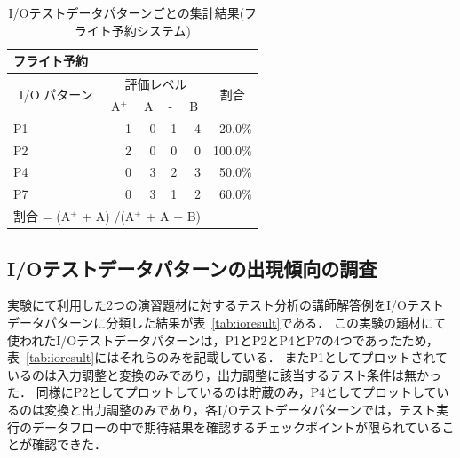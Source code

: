 \begin{table}[htbp]
  \centering
  \caption{I/Oテストデータパターンごとの集計結果(フライト予約システム)}
    \begin{tabular}{lllllr}
    フライト予約 &       &       &       &       &  \bigstrut[b]\\
    \hline
    \multicolumn{1}{|c|}{\multirow{2}[4]{*}{I/O パターン}} & \multicolumn{4}{c|}{評価レベル}    & \multicolumn{1}{c|}{\multirow{2}[4]{*}{割合}} \bigstrut\\
\cline{2-5}    \multicolumn{1}{|c|}{} & \multicolumn{1}{l|}{A${}^\text{+}$} & \multicolumn{1}{l|}{A} & \multicolumn{1}{l|}{-} & \multicolumn{1}{l|}{B} & \multicolumn{1}{c|}{} \bigstrut\\
    \hline
    \hline
    \multicolumn{1}{|l|}{P1} & \multicolumn{1}{r|}{1} & \multicolumn{1}{r|}{0} & \multicolumn{1}{r|}{1} & \multicolumn{1}{r|}{4} & \multicolumn{1}{r|}{20.0\%} \bigstrut\\
    \hline
    \multicolumn{1}{|l|}{P2} & \multicolumn{1}{r|}{2} & \multicolumn{1}{r|}{0} & \multicolumn{1}{r|}{0} & \multicolumn{1}{r|}{0} & \multicolumn{1}{r|}{100.0\%} \bigstrut\\
    \hline
    \multicolumn{1}{|l|}{P4} & \multicolumn{1}{r|}{0} & \multicolumn{1}{r|}{3} & \multicolumn{1}{r|}{2} & \multicolumn{1}{r|}{3} & \multicolumn{1}{r|}{50.0\%} \bigstrut\\
    \hline
    \multicolumn{1}{|l|}{P7} & \multicolumn{1}{r|}{0} & \multicolumn{1}{r|}{3} & \multicolumn{1}{r|}{1} & \multicolumn{1}{r|}{2} & \multicolumn{1}{r|}{60.0\%} \bigstrut\\
    \hline
    \multicolumn{5}{l}{割合 = (A${}^\text{+}$  +  A) /(A${}^\text{+}$  +  A + B) } &  \bigstrut[t]\\
    \end{tabular}%
\label{tab:D-4-tab20}%
\end{table}%

\subsection{I/Oテストデータパターンの出現傾向の調査}

実験にて利用した2つの演習題材に対するテスト分析の講師解答例をI/Oテストデータパターンに分類した結果が表~\ref{tab:ioresult}である．
この実験の題材にて使われたI/Oテストデータパターンは，P1とP2とP4とP7の4つであったため，表~\ref{tab:ioresult}にはそれらのみを記載している．
またP1としてプロットされているのは入力調整と変換のみであり，出力調整に該当するテスト条件は無かった．
同様にP2としてプロットしているのは貯蔵のみ，P4としてプロットしているのは変換と出力調整のみであり，各I/Oテストデータパターンでは，テスト実行のデータフローの中で期待結果を確認するチェックポイントが限られていることが確認できた．

